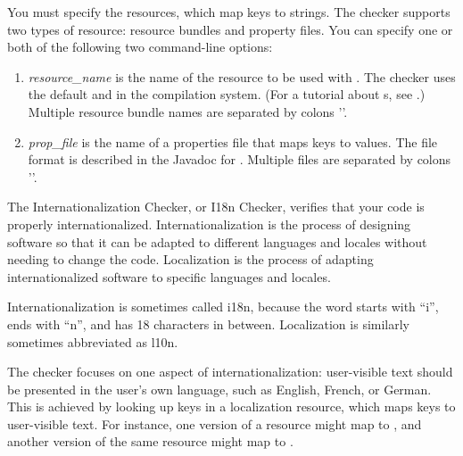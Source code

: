 You must specify the resources, which map keys to strings.
The checker supports two types of resource:
resource bundles and property files.  You can specify one or both of the
following two command-line options:

\begin{enumerate}

\item {}

  \emph{resource\_name} is the name of the resource to be used with
  .
  The checker uses the default  and  in the
  compilation system.
  (For a tutorial about s, see
  .)
  Multiple resource bundle names are separated by colons '\code{:}'.

\item {}

  \emph{prop\_file} is the name of a properties file that maps
  keys to values.  The file format is described in
  the Javadoc for
  .
  Multiple files are separated by colons '\code{:}'.

\end{enumerate}




The Internationalization Checker, or I18n Checker, verifies that your code is properly
internationalized.  Internationalization is the process of designing software so that
it can be adapted to different languages and locales without needing to change the code.
Localization is the process of adapting internationalized software to specific languages
and locales.

Internationalization is sometimes called i18n, because the word starts with ``i'',
ends with ``n'', and has 18 characters in between.  Localization is similarly
sometimes abbreviated as l10n.

The checker focuses on one aspect of internationalization:  user-visible text
should be presented in the user's own language, such as English, French, or
German.  This is achieved by looking up keys in a localization resource,
which maps keys to user-visible text.  For instance, one version of a
resource might map  to
, and another version of the same resource might map
 to .

